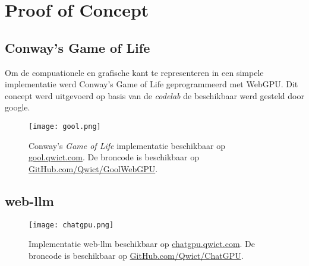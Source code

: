\chapter{Proof of Concept}

\section{Conway's Game of Life}

Om de compuationele en grafische kant te representeren in een simpele implementatie werd Conway's Game of Life geprogrammeerd met WebGPU. Dit concept werd uitgevoerd op basis van de \textit{codelab} de beschikbaar werd gesteld door google. \autocite{google2023, Qwict2024}

\begin{figure}
    \texttt{[image: gool.png]}
    \caption[Conway's \textit{Game of Life} implementatie]{
        Conway's \textit{Game of Life} implementatie beschikbaar op \href{https://gool.qwict.com}{gool.qwict.com}. De broncode is beschikbaar op \href{https://github.com/qwict/GoolWebGPU}{GitHub.com/Qwict/GoolWebGPU}.
    }
    \label{fig:Conway's Game of Life}
\end{figure}

\section{web-llm}

\begin{figure}
    \texttt{[image: chatgpu.png]}
    \caption[Implementatie web-llm]{
        Implementatie web-llm beschikbaar op \href{https://chatgpu.qwict.com}{chatgpu.qwict.com}. De broncode is beschikbaar op \href{https://github.com/qwict/chatgpu}{GitHub.com/Qwict/ChatGPU}.
    }
    \label{Implementatie web-llm}
\end{figure}